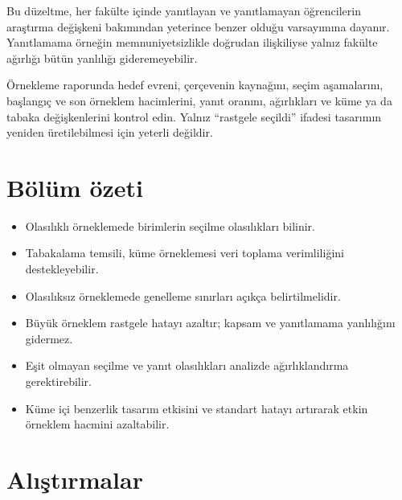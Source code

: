 Bu düzeltme, her fakülte içinde yanıtlayan ve yanıtlamayan öğrencilerin
araştırma değişkeni bakımından yeterince benzer olduğu varsayımına dayanır.
Yanıtlamama örneğin memnuniyetsizlikle doğrudan ilişkiliyse yalnız fakülte
ağırlığı bütün yanlılığı gideremeyebilir.

\begin{outputguidebox}
Örnekleme raporunda hedef evreni, çerçevenin kaynağını, seçim aşamalarını,
başlangıç ve son örneklem hacimlerini, yanıt oranını, ağırlıkları ve küme ya da
tabaka değişkenlerini kontrol edin. Yalnız ``rastgele seçildi'' ifadesi
tasarımın yeniden üretilebilmesi için yeterli değildir.
\end{outputguidebox}





\section{Bölüm özeti}

\begin{itemize}
  \item Olasılıklı örneklemede birimlerin seçilme olasılıkları bilinir.
  \item Tabakalama temsili, küme örneklemesi veri toplama verimliliğini destekleyebilir.
  \item Olasılıksız örneklemede genelleme sınırları açıkça belirtilmelidir.
  \item Büyük örneklem rastgele hatayı azaltır; kapsam ve yanıtlamama yanlılığını gidermez.
  \item Eşit olmayan seçilme ve yanıt olasılıkları analizde ağırlıklandırma
  gerektirebilir.
  \item Küme içi benzerlik tasarım etkisini ve standart hatayı artırarak etkin
  örneklem hacmini azaltabilir.
\end{itemize}

\section*{Alıştırmalar}


